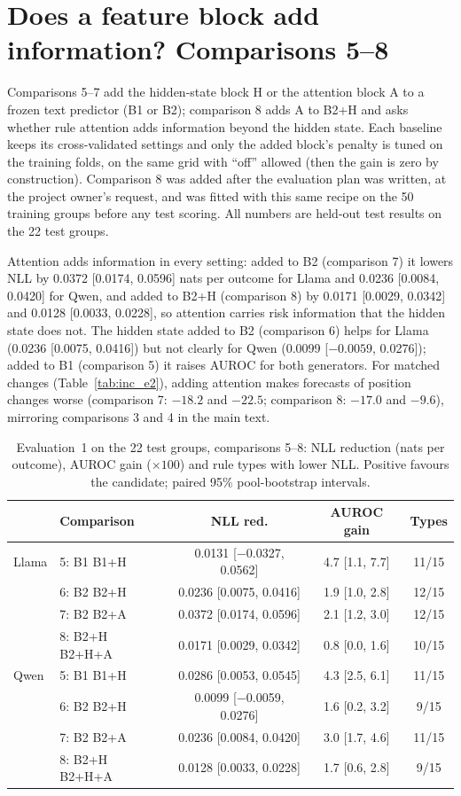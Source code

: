 \section{Does a feature block add information? Comparisons 5--8}
\label{app:incremental}
Comparisons 5--7 add the hidden-state block H or the attention block A to a frozen text predictor (B1 or B2); comparison 8 adds A to B2+H and asks whether rule attention adds information beyond the hidden state. Each baseline keeps its cross-validated settings and only the added block's penalty is tuned on the training folds, on the same grid with ``off'' allowed (then the gain is zero by construction). Comparison 8 was added after the evaluation plan was written, at the project owner's request, and was fitted with this same recipe on the 50 training groups before any test scoring. All numbers are held-out test results on the 22 test groups.

Attention adds information in every setting: added to B2 (comparison 7) it lowers NLL by 0.0372 [0.0174, 0.0596] nats per outcome for Llama and 0.0236 [0.0084, 0.0420] for Qwen, and added to B2+H (comparison 8) by 0.0171 [0.0029, 0.0342] and 0.0128 [0.0033, 0.0228], so attention carries risk information that the hidden state does not. The hidden state added to B2 (comparison 6) helps for Llama (0.0236 [0.0075, 0.0416]) but not clearly for Qwen (0.0099 [$-0.0059$, 0.0276]); added to B1 (comparison 5) it raises AUROC for both generators. For matched changes (Table~\ref{tab:inc_e2}), adding attention makes forecasts of position changes worse (comparison 7: $-18.2$ and $-22.5$; comparison 8: $-17.0$ and $-9.6$), mirroring comparisons 3 and 4 in the main text.

\begin{table}[h]
\centering\scriptsize
\caption{Evaluation~1 on the 22 test groups, comparisons 5--8: NLL reduction (nats per outcome), AUROC gain ($\times100$) and rule types with lower NLL. Positive favours the candidate; paired 95\% pool-bootstrap intervals.}
\label{tab:inc_e1}
\begin{tabular}{llccc}
\toprule
 & Comparison & NLL red. & AUROC gain & Types \\
\midrule
Llama & 5: B1 \cto{} B1+H & 0.0131 [$-$0.0327, 0.0562] & 4.7 [1.1, 7.7] & 11/15 \\
 & 6: B2 \cto{} B2+H & 0.0236 [0.0075, 0.0416] & 1.9 [1.0, 2.8] & 12/15 \\
 & 7: B2 \cto{} B2+A & 0.0372 [0.0174, 0.0596] & 2.1 [1.2, 3.0] & 12/15 \\
 & 8: B2+H \cto{} B2+H+A & 0.0171 [0.0029, 0.0342] & 0.8 [0.0, 1.6] & 10/15 \\
\midrule
Qwen & 5: B1 \cto{} B1+H & 0.0286 [0.0053, 0.0545] & 4.3 [2.5, 6.1] & 11/15 \\
 & 6: B2 \cto{} B2+H & 0.0099 [$-$0.0059, 0.0276] & 1.6 [0.2, 3.2] & 9/15 \\
 & 7: B2 \cto{} B2+A & 0.0236 [0.0084, 0.0420] & 3.0 [1.7, 4.6] & 11/15 \\
 & 8: B2+H \cto{} B2+H+A & 0.0128 [0.0033, 0.0228] & 1.7 [0.6, 2.8] & 9/15 \\
\bottomrule
\end{tabular}
\end{table}

